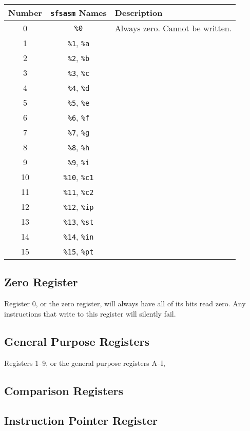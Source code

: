 \begin{tabularx}{\textwidth}{| c | c | X |} \hline
Number & {\tt sfsasm} Names & Description \\ \hline
0 & {\tt \%0} & Always zero. Cannot be written. \\ \hline
1 & {\tt \%1}, {\tt \%a} & \\ \hline
2 & {\tt \%2}, {\tt \%b} & \\ \hline
3 & {\tt \%3}, {\tt \%c} & \\ \hline
4 & {\tt \%4}, {\tt \%d} & \\ \hline
5 & {\tt \%5}, {\tt \%e} & \\ \hline
6 & {\tt \%6}, {\tt \%f} & \\ \hline
7 & {\tt \%7}, {\tt \%g} & \\ \hline
8 & {\tt \%8}, {\tt \%h} & \\ \hline
9 & {\tt \%9}, {\tt \%i} & \\ \hline
10 & {\tt \%10}, {\tt \%c1} & \\ \hline
11 & {\tt \%11}, {\tt \%c2} & \\ \hline
12 & {\tt \%12}, {\tt \%ip} & \\ \hline
13 & {\tt \%13}, {\tt \%st} & \\ \hline
14 & {\tt \%14}, {\tt \%in} & \\ \hline
15 & {\tt \%15}, {\tt \%pt} & \\ \hline
\end{tabularx}

\subsection{Zero Register}
Register 0, or the zero register, will always have all of its bits read zero. Any instructions that write to this register will silently fail.

\subsection{General Purpose Registers}
Registers 1--9, or the general purpose registers A--I,

\subsection{Comparison Registers}

\subsection{Instruction Pointer Register}

